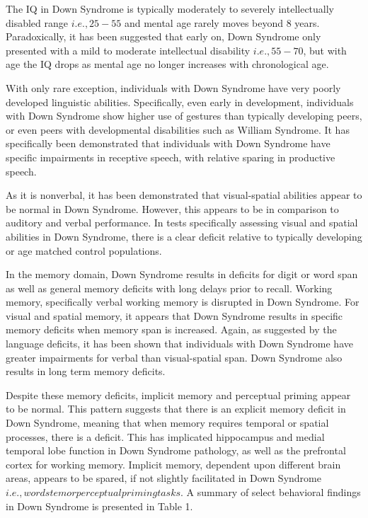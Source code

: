\documentclass{article}
\begin{document}
The IQ in Down Syndrome is typically moderately to severely intellectually disabled range \(i.e., 25-55\) and mental age rarely moves beyond 8 years. Paradoxically, it has been suggested that early on, Down Syndrome only presented with a mild to moderate intellectual disability \(i.e., 55-70\), but with age the IQ drops as mental age no longer increases with chronological age.

With only rare exception, individuals with Down Syndrome have very poorly developed linguistic abilities. Specifically, even early in development, individuals with Down Syndrome show higher use of gestures than typically developing peers, or even peers with developmental disabilities such as William Syndrome.  It has specifically been demonstrated that individuals with Down Syndrome have specific impairments in receptive speech, with relative sparing in productive speech.

As it is nonverbal, it has been demonstrated that visual-spatial abilities appear to be normal in Down Syndrome. However, this appears to be in comparison to auditory and verbal performance. In tests specifically assessing visual and spatial abilities in Down Syndrome, there is a clear deficit relative to typically developing or age matched control populations.

In the memory domain, Down Syndrome results in deficits for digit or word span as well as general memory deficits with long delays prior to recall. Working memory, specifically verbal working memory is disrupted in Down Syndrome. For visual and spatial memory, it appears that Down Syndrome results in specific memory deficits when memory span is increased. Again, as suggested by the language deficits, it has been shown that individuals with Down Syndrome have greater impairments for verbal than visual-spatial span. Down Syndrome also results in long term memory deficits.

Despite these memory deficits, implicit memory and perceptual priming appear to be normal. This pattern suggests that there is an explicit memory deficit in Down Syndrome, meaning that when memory requires temporal or spatial processes, there is a deficit. This has implicated hippocampus and medial temporal lobe function in Down Syndrome pathology, as well as the prefrontal cortex for working memory. Implicit memory, dependent upon different brain areas, appears to be spared, if not slightly facilitated in Down Syndrome \(i.e., word stem or perceptual priming tasks\). A summary of select behavioral findings in Down Syndrome is presented in Table 1.
\end{document}

